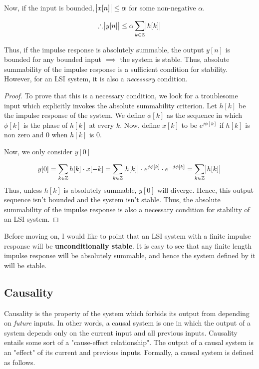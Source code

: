 \documentclass{article}
\theoremstyle{definition}
\begin{document}
Now, if the input is bounded, $\abs{x[n]} \leq \alpha$ for some non-negative $\alpha$. 

\[
	\therefore \abs{y[n]} \leq \alpha \sum_{k \in \mathbb{Z}} \abs{h[k]}
\]

Thus, if the impulse response is absolutely summable, the output $y[n]$ is bounded for any bounded input $\implies$ the system is stable. Thus, absolute summability of the impulse response is a sufficient condition for stability. However, for an LSI system, it is also a \textit{necessary} condition. 
\begin{proof}
To prove that this is a necessary condition, we look for a troublesome input which explicitly invokes the absolute summability criterion. Let $h[k]$ be the impulse response of the system. We define $\phi[k]$ as the sequence in which $\phi[k]$ is the phase of $h[k]$ at every $k$. Now, define $x[k]$ to be $e^{j \phi[k]}$ if $h[k]$ is non zero and $0$ when $h[k]$ is $0$. \smallskip

Now, we only consider $y[0]$

\[
	y[0] = \sum_{k \in \mathbb{Z}} h[k] \cdot x[-k] = \sum_{k \in \mathbb{Z}} \abs{h[k]} \cdot e^{j\phi[k]} \cdot e^{-j\phi[k]} = \sum_{k \in \mathbb{Z}} \abs{h[k]}
\] 
Thus, unless $h[k]$ is absolutely summable, $y[0]$ will diverge. Hence, this output sequence isn't bounded and the system isn't stable. Thus, the absolute summability of the impulse response is also a necessary condition for stability of an LSI system.
\end{proof}

Before moving on, I would like to point that an LSI system with a finite impulse response will be \textbf{unconditionally stable}. It is easy to see that any finite length impulse response will be absolutely summable, and hence the system defined by it will be stable.

\subsection{Causality}

Causality is the property of the system which forbids its output from depending on \textit{future} inputs. In other words, a causal system is one in which the output of a system depends only on the current input and all previous inputs. Causality entails some sort of a "cause-effect relationship". The output of a causal system is an "effect" of its current and previous inputs. Formally, a causal system is defined as follows. 
\end{document}
